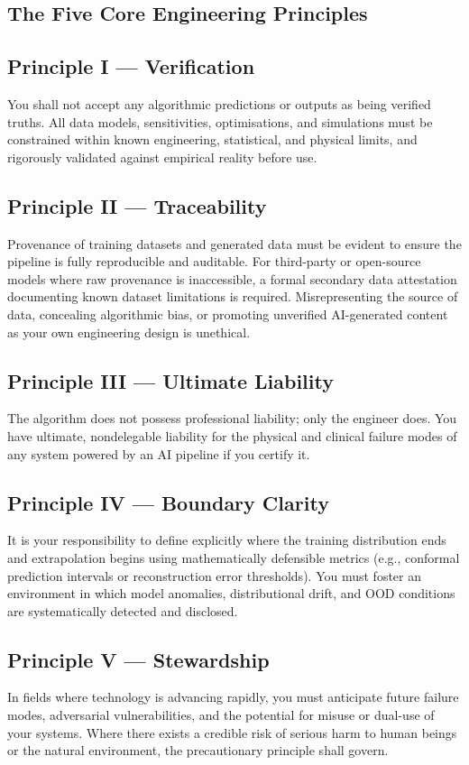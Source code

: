 ﻿\documentclass[11pt,a4paper]{article}
\begin{document}
\begin{samepage}
\section{The Five Core Engineering Principles}
\label{sec:principles}

\subsection*{Principle I --- Verification}
You shall not accept any algorithmic predictions or outputs as being verified truths. All data models, sensitivities, optimisations, and simulations must be constrained within known engineering, statistical, and physical limits, and rigorously validated against empirical reality before use.


\subsection*{Principle II --- Traceability}
Provenance of training datasets and generated data must be evident to ensure the pipeline is fully reproducible and auditable. For third-party or open-source models where raw provenance is inaccessible, a formal secondary data attestation documenting known dataset limitations is required. Misrepresenting the source of data, concealing algorithmic bias, or promoting unverified AI-generated content as your own engineering design is unethical.


\subsection*{Principle III --- Ultimate Liability}
The algorithm does not possess professional liability; only the engineer does. You have ultimate, nondelegable liability for the physical and clinical failure modes of any system powered by an AI pipeline if you certify it.

\subsection*{Principle IV --- Boundary Clarity}
It is your responsibility to define explicitly where the training distribution ends and extrapolation begins using mathematically defensible metrics (e.g., conformal prediction intervals or reconstruction error thresholds). You must foster an environment in which model anomalies, distributional drift, and \ac{OOD} conditions are systematically detected and disclosed.

\subsection*{Principle V --- Stewardship}
In fields where technology is advancing rapidly, you must anticipate future failure modes, adversarial vulnerabilities, and the potential for misuse or dual-use of your systems. Where there exists a credible risk of serious harm to human beings or the natural environment, the precautionary principle shall govern.

\end{samepage}
\end{document}
